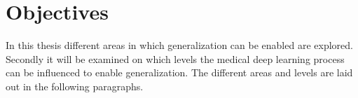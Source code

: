 













    \section{Objectives} %
        In this thesis different areas in which generalization can be enabled are explored. Secondly it will be examined on which levels the medical deep learning process can be influenced to enable generalization. The different areas and levels are laid out in the following paragraphs.

